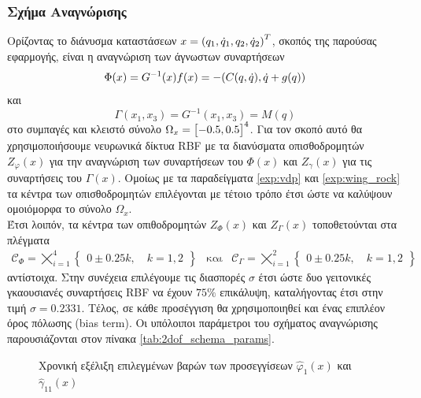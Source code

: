 {\subsubsection{Σχήμα Αναγνώρισης}
Ορίζοντας το διάνυσμα καταστάσεων $x = \pqty{q_1,\dot q_1,q_2,\dot q_2 }^T$, σκοπός της παρούσας εφαρμογής, είναι η αναγνώριση των άγνωστων συναρτήσεων
\begin{equation*}
	\Phi(x) = G^{-1}(x) f(x) = -\pqty{C(q,\dot q),\dot q + g(q)}
\end{equation*}
και 
\begin{equation*}
\Gamma(x_1, x_3) = G^{-1}(x_1, x_3) = M(q)
\end{equation*}
στο συμπαγές και κλειστό σύνολο $\Omega_x =\bmqty{-0.5,0.5}^4$. Για τον σκοπό αυτό θα χρησιμοποιήσουμε νευρωνικά δίκτυα RBF με τα  διανύσματα οπισθοδρομητών $Z_\varphi(x)$ για την αναγνώριση των συναρτήσεων του $\Phi(x)$ και $Z_\gamma(x)$ για τις συναρτήσεις του $\Gamma(x)$. Ομοίως με τα παραδείγματα \ref{exp:vdp} και \ref{exp:wing_rock} τα κέντρα των οπισθοδρομητών επιλέγονται με τέτοιο τρόπο έτσι ώστε να καλύψουν ομοιόμορφα το σύνολο $\Omega_x$.\\ 
Έτσι λοιπόν, τα κέντρα των οπιθοδρομητών $Z_\Phi(x)$ και $Z_\Gamma(x)$ τοποθετούνται στα πλέγματα
\begin{equation*}
\begin{matrix}
	\mathcal{C}_\Phi = \bigtimes\limits_{i=1}^{4}  \begin{Bmatrix}
	0 \pm  0.25 k, \quad  k = 1,2
	\end{Bmatrix}
&
\text{και}
&
\mathcal{C}_\Gamma = \bigtimes\limits_{i=1}^{2}  \begin{Bmatrix}
0 \pm  0.25 k, \quad  k = 1,2
\end{Bmatrix}
\end{matrix}
\end{equation*} 
αντίστοιχα. Στην συνέχεια επιλέγουμε τις διασπορές $\sigma$ έτσι ώστε δυο γειτονικές γκαουσιανές συναρτήσεις RBF να έχουν $75\%$ επικάλυψη, καταλήγοντας έτσι στην τιμή $\sigma = 0.2331$. Τέλος, σε κάθε προσέγγιση θα χρησιμοποιηθεί και ένας επιπλέον όρος πόλωσης (bias term). Οι υπόλοιποι παράμετροι του σχήματος αναγνώρισης παρουσιάζονται στον πίνακα \ref{tab:2dof_schema_params}.

}

\begin{figure}
	\begin{subfigure}{0.5\textwidth}
		
	\end{subfigure}
	\begin{subfigure}{0.5\textwidth}
		
	\end{subfigure}
	\caption{Χρονική εξέλιξη επιλεγμένων βαρών των προσεγγίσεων $\hat{\varphi}_1(x)$ και $\hat{\gamma}_{11}(x)$}
	\label{fig:2dof_w_conv}
\end{figure}

